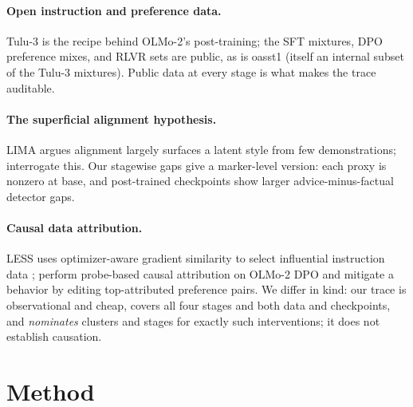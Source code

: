 \documentclass[11pt]{article}
\begin{document}
\paragraph{Open instruction and preference data.}
Tulu-3 \citep{lambert2024tulu3} is the recipe behind OLMo-2's post-training;
the SFT mixtures, DPO preference mixes, and RLVR sets are public, as is oasst1
\citep{kopf2023oasst1} (itself an internal subset of the Tulu-3 mixtures).
Public data at every stage is what makes the trace auditable.

\paragraph{The superficial alignment hypothesis.}
LIMA \citep{zhou2023lima} argues alignment largely surfaces a latent style
from few demonstrations; \citet{ghosh2024closer} interrogate this. Our
stagewise gaps give a marker-level version: each proxy is nonzero at base,
and post-trained checkpoints show larger advice-minus-factual detector gaps.

\paragraph{Causal data attribution.}
LESS uses optimizer-aware gradient similarity to select influential instruction
data \citep{xia2024less}; \citet{xiao2026probe} perform probe-based causal
attribution on OLMo-2 DPO and mitigate a behavior by editing top-attributed
preference pairs. We differ in kind: our trace is observational and cheap,
covers all four stages and both data and checkpoints, and \emph{nominates}
clusters and stages for exactly such interventions; it does not establish
causation.

\section{Method}
\end{document}
